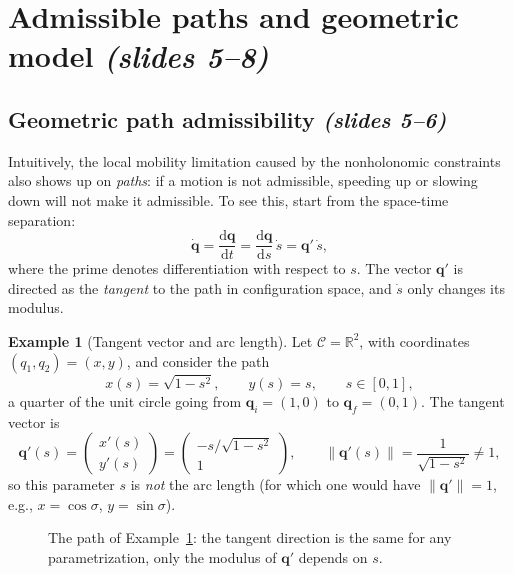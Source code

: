 \documentclass[11pt,a4paper]{article}
\newcommand{\q}{\boldsymbol{q}}
\newcommand{\qi}{\boldsymbol{q}_i}
\newcommand{\qf}{\boldsymbol{q}_f}
\newcommand{\dd}{\mathrm{d}}
\theoremstyle{definition}
\newtheorem{example}[definition]{Example}
\theoremstyle{plain}
\theoremstyle{remark}
\begin{document}
\section{Admissible paths and geometric model \emph{(slides 5--8)}}

\subsection{Geometric path admissibility \emph{(slides 5--6)}}

Intuitively, the local mobility limitation caused by the nonholonomic constraints also shows up on \emph{paths}: if a
motion is not admissible, speeding up or slowing down will not make it admissible. To see this, start from the
space-time separation:
\begin{equation}
\dot{\q}=\frac{\dd\q}{\dd t}=\frac{\dd\q}{\dd s}\,\dot s=\q'\,\dot s,
\label{eq:sep}
\end{equation}
where the prime denotes differentiation with respect to $s$. The vector $\q'$ is directed as the \emph{tangent} to the
path in configuration space, and $\dot s$ only changes its modulus.

\begin{example}[Tangent vector and arc length]\label{ex:arc}
Let $\mathcal C=\mathbb R^2$, with coordinates $(q_1,q_2)=(x,y)$, and consider the path
\[
x(s)=\sqrt{1-s^2},\qquad y(s)=s,\qquad s\in[0,1],
\]
a quarter of the unit circle going from $\qi=(1,0)$ to $\qf=(0,1)$. The tangent vector is
\[
\q'(s)=\begin{pmatrix}x'(s)\\ y'(s)\end{pmatrix}=\begin{pmatrix}-s/\sqrt{1-s^2}\\ 1\end{pmatrix},\qquad
\|\q'(s)\|=\frac{1}{\sqrt{1-s^2}}\ne 1 ,
\]
so this parameter $s$ is \emph{not} the arc length (for which one would have $\|\q'\|=1$, e.g., $x=\cos\sigma$, $y=\sin\sigma$).
\end{example}

\begin{figure}[H]
\centering
{}
\caption{The path of Example~\ref{ex:arc}: the tangent direction is the same for any parametrization, only the modulus of $\q'$ depends on $s$.}
\end{figure}
\end{document}
